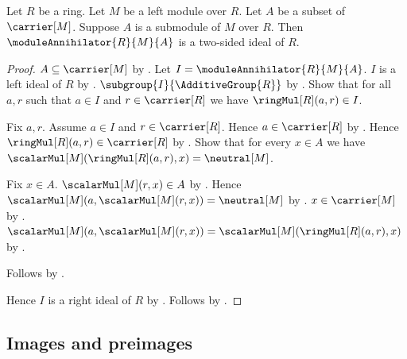\begin{theorem}\label{module_annihilator_is_two_sided_ideal}
    Let $R$ be a ring.
    Let $M$ be a left module over $R$.
    Let $A$ be a subset of $\carrier[M]$.
    Suppose $A$ is a submodule of $M$ over $R$.
    Then $\moduleAnnihilator{R}{M}{A}$ is a two-sided ideal of $R$.
\end{theorem}
\begin{proof}
    $A\subseteq\carrier[M]$ by .
    Let $I=\moduleAnnihilator{R}{M}{A}$.
    $I$ is a left ideal of $R$ by
        .
    $\subgroup{I}{\AdditiveGroup{R}}$ by
        .
    Show that for all $a,r$ such that $a\in I$ and $r\in\carrier[R]$
        we have $\ringMul[R](a,r)\in I$.
    \begin{subproof}
        Fix $a,r$.
        Assume $a\in I$ and $r\in\carrier[R]$.
        Hence $a\in\carrier[R]$ by .
        Hence $\ringMul[R](a,r)\in\carrier[R]$ by .
        Show that for every $x\in A$ we have
            $\scalarMul[M](\ringMul[R](a,r),x)=\neutral[M]$.
        \begin{subproof}
            Fix $x\in A$.
            $\scalarMul[M](r,x)\in A$ by .
            Hence
                $\scalarMul[M](a,\scalarMul[M](r,x))=\neutral[M]$ by
                .
            $x\in\carrier[M]$ by .
            $\scalarMul[M](a,\scalarMul[M](r,x))
                =\scalarMul[M](\ringMul[R](a,r),x)$ by
                .
        \end{subproof}
        Follows by .
    \end{subproof}
    Hence $I$ is a right ideal of $R$ by
        .
    Follows by .
\end{proof}

\subsection{Images and preimages}

